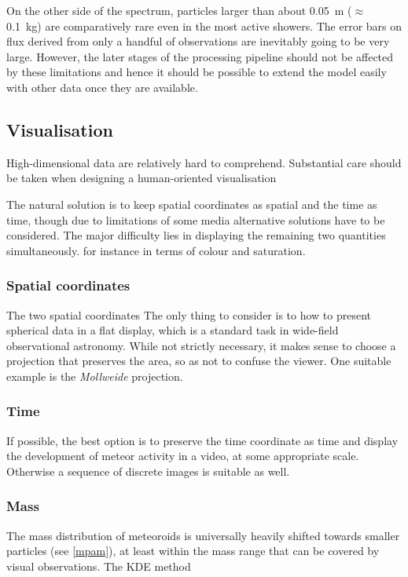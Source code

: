         On the other side of the spectrum, particles larger than about \SI{0.05}{\metre} ($\approx$ \SI{0.1}{\kilo\gram})
        are comparatively rare even in the most active showers.
        The error bars on flux derived from only a handful of observations are inevitably going to be very large.
        However, the later stages of the processing pipeline should not be affected by these limitations
        and hence it should be possible to extend the model easily with other data once they are available.

    \subsection{Visualisation} \label{iov}
        High-dimensional data are relatively hard to comprehend. Substantial care should be taken when designing
        a human-oriented visualisation


        The natural solution is to keep spatial coordinates as spatial and the time as time,
        though due to limitations of some media alternative solutions have to be considered.
        The major difficulty lies in displaying the remaining two quantities simultaneously.
        for instance in terms of colour and saturation.

        \subsubsection{Spatial coordinates} \label{iovs}
            The two spatial coordinates 
            The only thing to consider is to how to present spherical data in a flat display,
            which is a standard task in wide-field observational astronomy.
            While not strictly necessary, it makes sense to choose a projection
            that preserves the area, so as not to confuse the viewer.
            One suitable example is the \emph{Mollweide} projection.

        \subsubsection{Time} \label{iovt}
            If possible, the best option is to preserve the time coordinate as time
            and display the development of meteor activity in a video, at some appropriate scale.
            Otherwise a sequence of discrete images is suitable as well.

        \subsubsection{Mass} \label{iovm}
            The mass distribution of meteoroids is universally heavily shifted
            towards smaller particles (see \cref{mpam}), at least within the mass
            range that can be covered by visual observations.
            The KDE method


